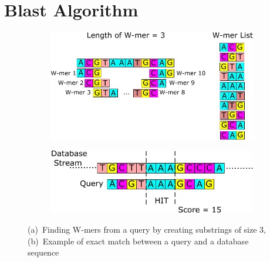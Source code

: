 \section{Blast Algorithm}
\label{sec:blast}

\begin{figure}[t!]
\centering
	\begin{subfigure}[]
    \centering
    \includegraphics[width=0.8\columnwidth]{Figures/Algorithm1.pdf} 
    \end{subfigure}
	\begin{subfigure}[]
    \centering
    \includegraphics[width=0.8\columnwidth]{Figures/Algorithm2.pdf}
	\end{subfigure}
	\caption{(a)~Finding W-mers from a query by creating substrings of size 3, (b)~Example of exact match between a query and a database sequence}
	\label{fig:step12}
    \vspace{-3 mm}
\end{figure}

